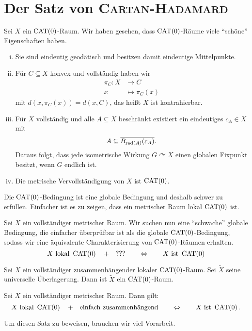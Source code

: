 \chapter{Der Satz von \textsc{Cartan-Hadamard}} %
\label{cha:2}

Sei $X$ ein $\operatorname{CAT(0)}$-Raum. Wir haben gesehen, dass $\operatorname{CAT(0)}$-Räume viele \enquote{schöne} Eigenschaften haben.

\begin{enumerate}[(i)]
	\item Sie sind eindeutig geodätisch und besitzen damit eindeutige Mittelpunkte.
	\item Für $C \subseteq X$ konvex und vollständig haben wir
	\begin{align*}
		\pi_C \colon X &\longrightarrow C \\
		x &\longmapsto \pi_C(x)
	\end{align*}
	mit $d(x,\pi_C(x)) = d(x,C)$, das heißt $X$ ist kontrahierbar.
	\item Für $X$ vollständig und alle $A \subseteq X$ beschränkt existiert ein eindeutiges $c_A \in X$ mit
	\[
		A \subseteq \overline{B_{\operatorname{rad}(A)}(c_A)}.
	\]
	Daraus folgt, dass jede isometrische Wirkung $G \curvearrowright X$ einen globalen Fixpunkt besitzt, wenn $G$ endlich ist.
	\item Die metrische Vervollständigung von $X$ ist $\operatorname{CAT(0)}$.
\end{enumerate}

Die $\operatorname{CAT(0)}$-Bedingung ist eine globale Bedingung und deshalb schwer zu erfüllen. Einfacher ist es zu zeigen, dass ein metrischer Raum lokal $\operatorname{CAT(0)}$ ist. 

Sei $X$ ein vollständiger metrischer Raum. Wir suchen nun eine \enquote{schwache} globale Bedingung, die einfacher überprüfbar ist als die globale $\operatorname{CAT(0)}$-Bedingung, sodass wir eine äquivalente Charakterisierung von $\operatorname{CAT(0)}$-Räumen erhalten.
\[
	X \text{ lokal } \operatorname{CAT(0)} \quad + \quad \text{???} \qquad \Leftrightarrow \qquad X \text{ ist } \operatorname{CAT(0)}
\]

\begin{satz}
\label{satz:2.1}
	Sei $X$ ein vollständiger zusammenhängender lokaler $\operatorname{CAT(0)}$-Raum.
	Sei $\widetilde{X}$ seine universelle Überlagerung.
	Dann ist $\widetilde{X}$ ein $\operatorname{CAT(0)}$-Raum.
\end{satz}

\begin{korollar}
\label{kor:2.2}
	Sei $X$ ein vollständiger metrischer Raum.
	Dann  gilt:
	\[
		X \text{ lokal } \operatorname{CAT(0)} \quad + \quad \text{einfach zusammenhängend} \qquad \Leftrightarrow \qquad X \text{ ist } \operatorname{CAT(0)}.
	\]
\end{korollar}

Um diesen Satz zu beweisen, brauchen wir viel Vorarbeit.







\cleardoubleoddemptypage